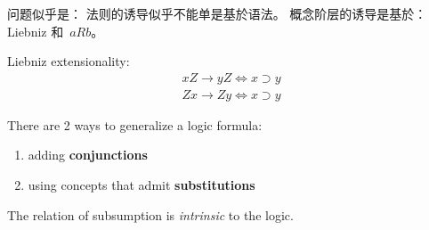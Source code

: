 问题似乎是： 法则的诱导似乎不能单是基於语法。 概念阶层的诱导是基於： Liebniz 和\  $a R b$。

Liebniz extensionality:
\begin{eqnarray}
xZ \rightarrow yZ \Leftrightarrow x \supset y \\
Zx \rightarrow Zy \Leftrightarrow x \supset y
\end{eqnarray}

There are 2 ways to generalize a logic formula:
\begin{enumerate}
\item adding \textbf{conjunctions}
\item using concepts that admit \textbf{substitutions}
\end{enumerate}

The relation of subsumption is \textit{intrinsic} to the logic.  

\familydefault